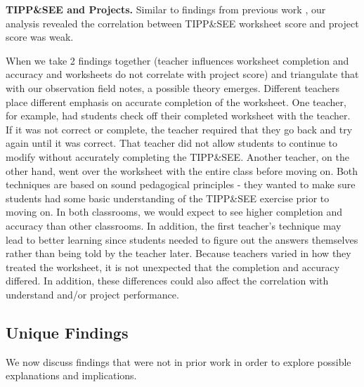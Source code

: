\documentclass[sigconf,manuscript,review,anonymous]{acmart} %
\def\ts{TIPP\&SEE}
\newcommand{\Scratchencore}[0]{Blinded Curriculum}
\begin{document}

\textbf{\ts{} and Projects.} Similar to findings from previous work \cite{franklin2020exploring}, our analysis revealed the correlation between \ts{} worksheet score and project score was weak. 

When we take 2 findings together (teacher influences worksheet completion and accuracy and worksheets do not correlate with project score) and triangulate that with our observation field notes, a possible theory emerges. 
 Different teachers place different emphasis on accurate completion of the worksheet. One teacher, for example, had students check off their completed worksheet with the teacher. If it was not correct or complete, the teacher required that they go back and try again until it was correct. That teacher did not allow students to continue to modify without accurately completing the \ts{}. Another teacher, on the other hand, went over the worksheet with the entire class before moving on. Both techniques are based on sound pedagogical principles - they wanted to make sure students had some basic understanding of the \ts{} exercise prior to moving on. In both classrooms, we would expect to see higher completion and accuracy than other classrooms. In addition, the first teacher's technique may lead to better learning since students needed to figure out the answers themselves rather than being told by the teacher later. Because teachers varied in how they treated the worksheet, it is not unexpected that the completion and accuracy differed. In addition, these differences could also affect the correlation with understand and/or project performance.
 
 \subsection{Unique Findings}
 We now discuss findings that were not in prior work in order to explore possible explanations and implications.
\end{document}
